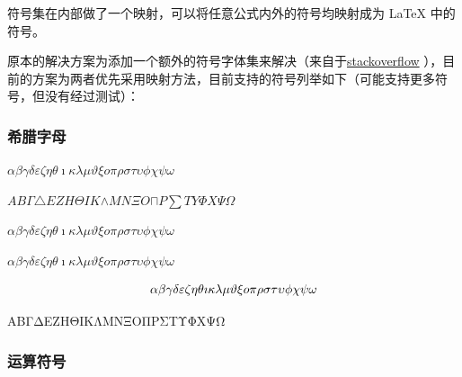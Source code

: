 \documentclass{article}%
\begin{document}
%
符号集在内部做了一个映射，可以将任意公式内外的符号均映射成为 LaTeX 中的符号。%

%
原本的解决方案为添加一个额外的符号字体集来解决（来自于\href{https://tex.stackexchange.com/questions/69901/how-to-typeset-greek-letters}{stackoverflow} ），目前的方案为两者优先采用映射方法，目前支持的符号列举如下（可能支持更多符号，但没有经过测试）：%

%
\subsubsection{希腊字母}%

%
$\alpha{}$$\beta{}$$\gamma{}$$\delta{}$$\varepsilon{}$$\zeta{}$$\eta{}$$\theta{}$$\imath{}$$\kappa{}$$\lambda{}$$\mu{}$$\vartheta{}$$\xi{}$$o{}$$\pi{}$$\rho{}$$\sigma{}$$\tau{}$$\upsilon{}$$\phi{}$$\chi{}$$\psi{}$$\omega{}$%

%
$A{}$$B{}$$\Gamma{}$$\triangle{}$$E{}$$Z{}$$H{}$$\Theta{}$$I{}$$K{}$$\wedge{}$$M{}$$N{}$$\Xi{}$$O{}$$\sqcap{}$$P{}$$\sum{}$$T{}$$Y{}$$\Phi{}$$X{}$$\Psi{}$$\Omega{}$%

%

%
\textbf{$\alpha{}$$\beta{}$$\gamma{}$$\delta{}$$\varepsilon{}$$\zeta{}$$\eta{}$$\theta{}$$\imath{}$$\kappa{}$$\lambda{}$$\mu{}$$\vartheta{}$$\xi{}$$o{}$$\pi{}$$\rho{}$$\sigma{}$$\tau{}$$\upsilon{}$$\phi{}$$\chi{}$$\psi{}$$\omega{}$}%

%
%

%
 $\alpha{}\beta{}\gamma{}\delta{}\varepsilon{}\zeta{}\eta{}\theta{}\imath{}\kappa{}\lambda{}\mu{}\vartheta{}\xi{}o{}\pi{}\rho{}\sigma{}\tau{}\upsilon{}\phi{}\chi{}\psi{}\omega{}$ %

%

%
\[%
\alpha{}\beta{}\gamma{}\delta{}\varepsilon{}\zeta{}\eta{}\theta{}\imath{}\kappa{}\lambda{}\mu{}\vartheta{}\xi{}o{}\pi{}\rho{}\sigma{}\tau{}\upsilon{}\phi{}\chi{}\psi{}\omega{}\\%
\]%

%
%

%

%
\begin{langbox}[Tex]%
ΑΒΓΔΕΖΗΘΙΚΛΜΝΞΟΠΡΣΤΥΦΧΨΩ%
\end{langbox}%

%
%

%
\subsubsection{运算符号}%
\end{document}
